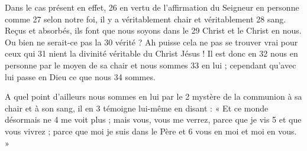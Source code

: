Dans le cas présent en effet,	 
26	 	en vertu de l'affirmation du Seigneur en personne comme	 
27	 	selon notre foi, il y a véritablement chair et véritablement	 
28	 	sang. Reçus et absorbés, ils font que nous soyons dans le	 
29	 	Christ et le Christ en nous. Ou bien ne serait-ce pas la	 
30	 	vérité ? Ah puisse cela ne pas se trouver vrai pour ceux qui	 
31	 	nient la divinité véritable du Christ Jésus ! Il est donc en	 
32	 	nous en personne par le moyen de sa chair et nous sommes	 
33	 	en lui ; cependant qu'avec lui passe en Dieu ce que nous	 
34	 	sommes.

A quel point d'ailleurs nous sommes en lui par le	 
2	 	mystère de la communion à sa chair et à son sang, il en	 
3	 	témoigne lui-même en disant : « Et ce monde désormais ne	 
4	 	me voit plus ; mais vous, vous me verrez, parce que je vis	 
5	 	et que vous vivrez ; parce que moi je suis dans le Père et	 
6	 	vous en moi et moi en vous. »